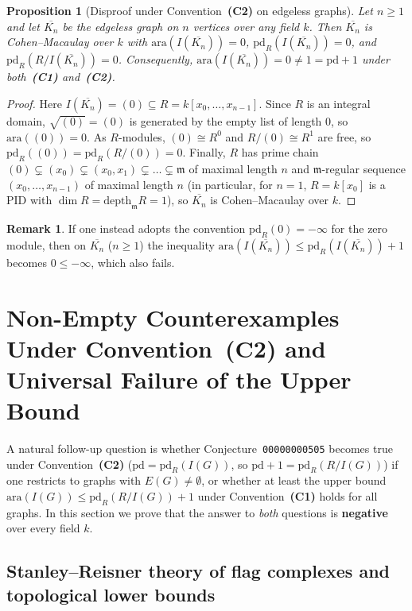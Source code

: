 \documentclass[11pt,a4paper]{amsart}
\theoremstyle{plain}
\newtheorem{proposition}[theorem]{Proposition}
\theoremstyle{definition}
\newtheorem{remark}[theorem]{Remark}
\newcommand{\ara}{\mathrm{ara}}
\newcommand{\pd}{\mathrm{pd}}
\newcommand{\depth}{\mathrm{depth}}
\newcommand{\mm}{\mathfrak{m}}
\begin{document}
\begin{proposition}[Disproof under Convention~\textbf{(C2)} on edgeless graphs]\label{prop:edgeless}
Let $n \ge 1$ and let $\overline{K_n}$ be the edgeless graph on $n$ vertices over any field $k$. Then $\overline{K_n}$ is Cohen--Macaulay over $k$ with $\ara(I(\overline{K_n})) = 0$, $\pd_R(I(\overline{K_n})) = 0$, and $\pd_R(R/I(\overline{K_n})) = 0$. Consequently, $\ara(I(\overline{K_n})) = 0 \neq 1 = \pd + 1$ under both~\textbf{(C1)} and~\textbf{(C2)}.
\end{proposition}

\begin{proof}
Here $I(\overline{K_n}) = (0) \subseteq R = k[x_0,\dots,x_{n-1}]$. Since $R$ is an integral domain, $\sqrt{(0)} = (0)$ is generated by the empty list of length $0$, so $\ara((0)) = 0$. As $R$-modules, $(0) \cong R^0$ and $R/(0) \cong R^1$ are free, so $\pd_R((0)) = \pd_R(R/(0)) = 0$. Finally, $R$ has prime chain $(0) \subsetneq (x_0) \subsetneq (x_0,x_1) \subsetneq \dots \subsetneq \mm$ of maximal length $n$ and $\mm$-regular sequence $(x_0,\dots,x_{n-1})$ of maximal length $n$ (in particular, for $n = 1$, $R = k[x_0]$ is a PID with $\dim R = \depth_{\mm} R = 1$), so $\overline{K_n}$ is Cohen--Macaulay over $k$.
\end{proof}

\begin{remark}\label{rem:zero-pd}
If one instead adopts the convention $\pd_R(0) = -\infty$ for the zero module, then on $\overline{K_n}$ ($n \ge 1$) the inequality $\ara(I(\overline{K_n})) \le \pd_R(I(\overline{K_n})) + 1$ becomes $0 \le -\infty$, which also fails.
\end{remark}

\section{Non-Empty Counterexamples Under Convention~(C2) and Universal Failure of the Upper Bound}\label{sec:flag-manifolds}

A natural follow-up question is whether Conjecture~\texttt{00000000505} becomes true under Convention~\textbf{(C2)} ($\pd = \pd_R(I(G))$, so $\pd + 1 = \pd_R(R/I(G))$) if one restricts to graphs with $E(G) \neq \emptyset$, or whether at least the upper bound $\ara(I(G)) \le \pd_R(R/I(G)) + 1$ under Convention~\textbf{(C1)} holds for all graphs. In this section we prove that the answer to \emph{both} questions is \textbf{negative} over every field $k$.

\subsection{Stanley--Reisner theory of flag complexes and topological lower bounds}
\end{document}
